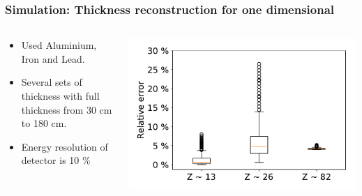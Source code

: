 \documentclass[11pt]{beamer}
\begin{document}
 \begin{frame}
\frametitle{Simulation: Thickness reconstruction for  one dimensional}
\begin{columns}
            \begin{column}{0.4\textwidth}
                \begin{itemize}
                    \item Used Aluminium, Iron and Lead.
                    \item Several sets of thickness with full thickness from 30 cm to 180 cm.
                    \item Energy resolution of detector is 10 \%
                    
                \end{itemize}
            \end{column}
    \begin{column}{0.7\textwidth} 
        \includegraphics[width=1\textwidth]{figures/relError.pdf}
    \end{column}
\end{columns}  
\end{frame}
\end{document}
